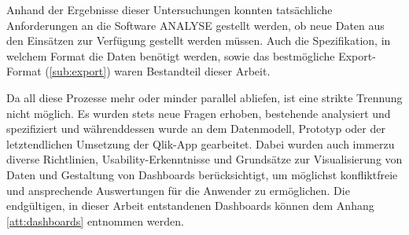 Anhand der Ergebnisse dieser Untersuchungen konnten tatsächliche Anforderungen an die Software \gls{ANALYSE} gestellt werden, ob neue Daten aus den Einsätzen zur Verfügung gestellt werden müssen.
Auch die Spezifikation, in welchem Format die Daten benötigt werden, 
sowie das bestmögliche Export-Format (\ref{sub:export}) waren Bestandteil dieser Arbeit. 

Da all diese Prozesse mehr oder minder parallel abliefen, ist eine strikte Trennung nicht möglich.
Es wurden stets neue Fragen erhoben, bestehende analysiert und spezifiziert und währenddessen wurde an dem Datenmodell, Prototyp oder der letztendlichen Umsetzung der Qlik-App gearbeitet.
Dabei wurden auch immerzu diverse Richtlinien, Usability-Erkenntnisse und Grundsätze zur Visualisierung von Daten und Gestaltung von Dashboards 
berücksichtigt, um möglichst konfliktfreie und ansprechende Auswertungen für die Anwender zu ermöglichen.
Die endgültigen, in dieser Arbeit entstandenen Dashboards können dem Anhang \ref{att:dashboards} entnommen werden.



